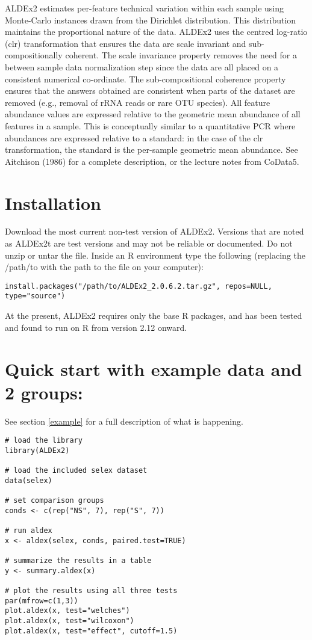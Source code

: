 \documentclass[11pt]{article}
\begin{document}
ALDEx2 estimates per-feature technical variation within each sample using Monte-Carlo instances drawn from the Dirichlet distribution. This distribution maintains the proportional nature of the data. ALDEx2 uses the centred log-ratio (clr) transformation that ensures the data are scale invariant and sub-compositionally coherent\cite{Aitchison:1986}. The scale invariance property removes the need for a between sample data normalization step since the data are all placed on a consistent numerical co-ordinate. The sub-compositional coherence property ensures that the answers obtained are consistent when parts of the dataset are removed (e.g., removal of rRNA reads or rare OTU species). All feature abundance values are expressed relative to the geometric mean abundance of all features in a sample. This is conceptually similar to a quantitative PCR where abundances are expressed relative to a standard: in the case of the clr transformation, the standard is the per-sample geometric mean abundance. See Aitchison (1986)\cite{Aitchison:1986} for a complete description, or the lecture notes from CoData5\cite{aitchisonconcise}.

\section{Installation}
Download the most current non-test version of ALDEx2. Versions that are noted as ALDEx2t are test versions and may not be reliable or documented. Do not unzip or untar the file. Inside an R environment type the following  (replacing the /path/to with the path to the file on your computer):
\begin{verbatim}
install.packages("/path/to/ALDEx2_2.0.6.2.tar.gz", repos=NULL, type="source")
\end{verbatim}
At the present, ALDEx2 requires only the base R packages, and has been tested and found to run on R from version 2.12 onward.

\section{Quick start with example data and 2 groups:}
See section \ref{example} for a full description of what is happening.\\
\begin{verbatim}
# load the library
library(ALDEx2)  

# load the included selex dataset
data(selex)  

# set comparison groups
conds <- c(rep("NS", 7), rep("S", 7))  

# run aldex
x <- aldex(selex, conds, paired.test=TRUE)  

# summarize the results in a table
y <- summary.aldex(x)  

# plot the results using all three tests
par(mfrow=c(1,3)) 
plot.aldex(x, test="welches")
plot.aldex(x, test="wilcoxon")
plot.aldex(x, test="effect", cutoff=1.5)
\end{verbatim}
\end{document}
